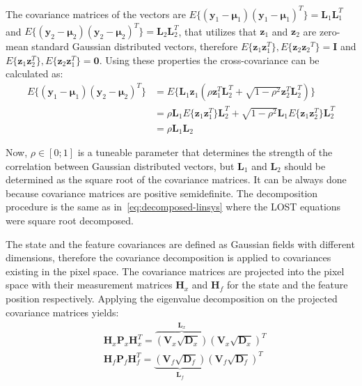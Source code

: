 The covariance matrices of the vectors are $E\{(\mathbf{y}_1-\boldsymbol{\mu}_1){(\mathbf{y}_1-\boldsymbol{\mu}_1)}^T\}=\mathbf{L}_1\mathbf{L}_1^T$ and $E\{(\mathbf{y}_2-\boldsymbol{\mu}_2){(\mathbf{y}_2-\boldsymbol{\mu}_2)}^T\}=\mathbf{L}_2\mathbf{L}_2^T$, that utilizes that $\mathbf{z}_1$ and $\mathbf{z}_2$ are zero-mean standard Gaussian distributed vectors, therefore $E\{\mathbf{z}_1\mathbf{z}_1^T\}, E\{\mathbf{z}_2{\mathbf{z}_2}^T\}=\mathbf{I}$ and $E\{\mathbf{z}_1\mathbf{z}_2^T\}, E\{\mathbf{z}_2\mathbf{z}_1^T\}=\mathbf{0}$. Using these properties the cross-covariance can be calculated as:
\begin{equation}
\begin{aligned}    
    E\{(\mathbf{y}_1-\boldsymbol{\mu}_1){(\mathbf{y}_2-\boldsymbol{\mu}_2)}^T\}&=E\{\mathbf{L}_1\mathbf{z}_1(\rho\mathbf{z}_1^T\mathbf{L}_2^T+\sqrt{1-\rho^2}\mathbf{z}_2^T\mathbf{L}_2^T)\} \\ &=
    \rho\mathbf{L}_1 E\{\mathbf{z}_1\mathbf{z}_1^T\}\mathbf{L}_2^T+\sqrt{1-\rho^2}\mathbf{L}_1E\{\mathbf{z}_1\mathbf{z}_2^T\}\mathbf{L}_2^T \\ &=
    \rho\mathbf{L}_1\mathbf{L}_2
\end{aligned}
\end{equation}

Now, $\rho\in[0;1]$ is a tuneable parameter that determines the strength of the correlation between Gaussian distributed vectors, but $\mathbf{L}_1$ and $\mathbf{L}_2$ should be determined as the square root of the covariance matrices. It can be always done because covariance matrices are positive semidefinite. The decomposition procedure is the same as in~\eqref{eq:decomposed-linsys} where the LOST equations were square root decomposed.

The state and the feature covariances are defined as Gaussian fields with different dimensions, therefore the covariance decomposition is applied to covariances existing in the pixel space. The covariance matrices are projected into the pixel space with their measurement matrices $\mathbf{H}_x$ and $\mathbf{H}_f$ for the state and the feature position respectively. Applying the eigenvalue decomposition on the projected covariance matrices yields:
\begin{equation}
\begin{aligned}
    & \mathbf{H}_x\mathbf{P}_x\mathbf{H}_x^T=\overbrace{\left(\mathbf{V}_x\sqrt{\mathbf{D}_x}\right)}^{\mathbf{L}_x}{\left(\mathbf{V}_x\sqrt{\mathbf{D}_x}\right)}^T \\
    & \mathbf{H}_f\mathbf{P}_f\mathbf{H}_f^T=\underbrace{\left(\mathbf{V}_f\sqrt{\mathbf{D}_f}\right)}_{\mathbf{L}_f}{\left(\mathbf{V}_f\sqrt{\mathbf{D}_f}\right)}^T \\
\end{aligned}
\end{equation}

